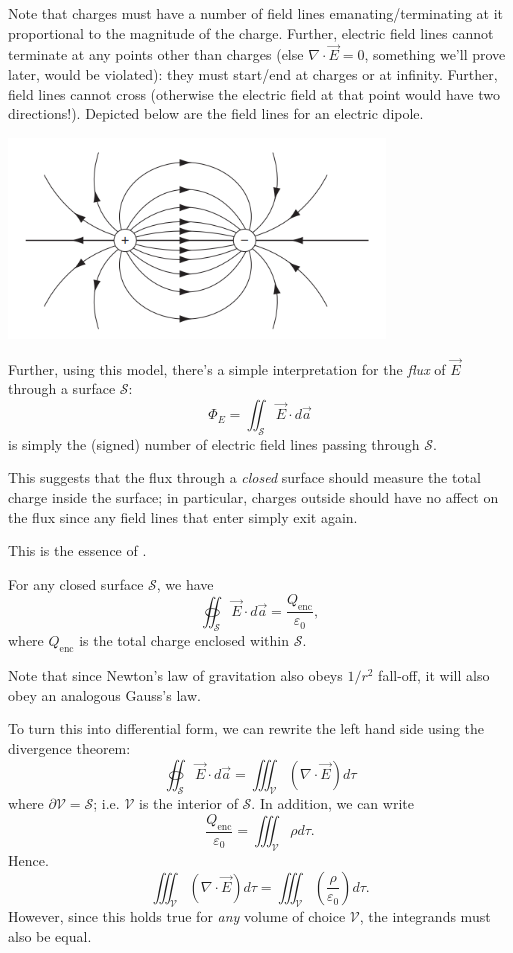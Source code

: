 Note that charges must have a number of field lines emanating/terminating at it proportional to the magnitude of the charge. Further, electric field lines cannot terminate at any points other than charges (else $\nabla\cdot\vec{E}=0$, something we'll prove later, would be violated): they must start/end at charges or at infinity. Further, field lines cannot cross (otherwise the electric field at that point would have two directions!). Depicted below are the field lines for an electric dipole.

\begin{center}
    \includegraphics[width=10cm]{Electrodynamics/images/fig2.13.PNG}
\end{center}

Further, using this model, there's a simple interpretation for the \textit{flux} of $\vec{E}$ through a surface $\mathcal{S}$:
\[\Phi_E=\iint_{\mathcal{S}}\vec{E}\cdot d\vec{a}\]
is simply the (signed) number of electric field lines passing through $\mathcal{S}$.

This suggests that the flux through a \textit{closed} surface should measure the total charge inside the surface; in particular, charges outside should have no affect on the flux since any field lines that enter simply exit again.

This is the essence of .

\begin{theorem}
    For any closed surface $\mathcal{S}$, we have
    \[\oiint_{\mathcal{S}}\vec{E}\cdot d\vec{a}=\frac{Q_{\text{enc}}}{\varepsilon_0},\]
    where $Q_{\text{enc}}$ is the total charge enclosed within $\mathcal{S}$.
\end{theorem}

Note that since Newton's law of gravitation also obeys $1/r^2$ fall-off, it will also obey an analogous Gauss's law.

To turn this into differential form, we can rewrite the left hand side using the divergence theorem:
\[\oiint_{\mathcal{S}}\vec{E}\cdot d\vec{a}=\iiint_{\mathcal{V}}(\nabla\cdot \vec{E})d\tau\]
where $\partial\mathcal{V}=\mathcal{S}$; i.e. $\mathcal{V}$ is the interior of $\mathcal{S}$. In addition, we can write
\[\frac{Q_{\text{enc}}}{\varepsilon_0}=\iiint_{\mathcal{V}}\rho d\tau.\]
Hence.
\[\iiint_{\mathcal{V}}(\nabla\cdot\vec{E})d\tau=\iiint_{\mathcal{V}}\left(\frac{\rho}{\varepsilon_0}\right)d\tau.\]
However, since this holds true for \textit{any} volume of choice $\mathcal{V}$, the integrands must also be equal.

